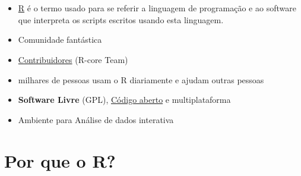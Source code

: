\documentclass[]{book}
\begin{document}
\section{}\label{section}

\begin{itemize}
\item
  \href{https://www.r-project.org/}{R} é o termo usado para se referir a
  linguagem de programação e ao software que interpreta os scripts
  escritos usando esta linguagem.
\item
  Comunidade fantástica
\item
  \href{https://www.r-project.org/contributors.html}{Contribuidores}
  (R-core Team)
\item
  milhares de pessoas usam o R diariamente e ajudam outras pessoas
\item
  \textbf{Software Livre} (GPL),
  \href{https://github.com/wch/r-source}{Código aberto} e
  multiplataforma 
\item
  Ambiente para Análise de dados interativa
\end{itemize}

\section{Por que o R?}\label{por-que-o-r}
\end{document}
